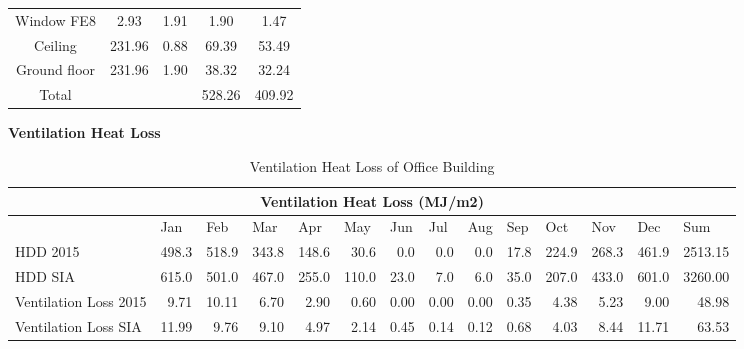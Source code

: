 \documentclass[11pt, a4paper]{article}
\theoremstyle{definition}
\begin{document}
\begin{table}[H]
\begin{tabular}{crrrr}
		    Window FE8 & \multicolumn{1}{c}{2.93} & \multicolumn{1}{c}{1.91} & \multicolumn{1}{c}{1.90} & \multicolumn{1}{c}{1.47} \\
		    Ceiling & \multicolumn{1}{c}{231.96} & \multicolumn{1}{c}{0.88} & \multicolumn{1}{c}{69.39} & \multicolumn{1}{c}{53.49} \\
		    Ground floor & \multicolumn{1}{c}{231.96} & \multicolumn{1}{c}{1.90} & \multicolumn{1}{c}{38.32} & \multicolumn{1}{c}{32.24} \\
		    \midrule
		    Total &       &       & 528.26 & 409.92 \\
		    \bottomrule
		    \end{tabular}%
		  \label{tab:SumatraTransmission Loss}%
		\end{table}%


		\textbf{Ventilation Heat Loss}\\
\begin{table}[H]
  \centering
  \small
  \caption{Ventilation Heat Loss of Office Building}
    \begin{tabular}{|p{4.5em}rrrrrrrrrrrrr|}
    \toprule
    \multicolumn{14}{|c|}{Ventilation Heat Loss (MJ/m2)} \\
    \midrule
    \multicolumn{1}{|l}{ } & \multicolumn{1}{l}{Jan} & \multicolumn{1}{l}{Feb} & \multicolumn{1}{l}{Mar} & \multicolumn{1}{l}{Apr} & \multicolumn{1}{l}{May} & \multicolumn{1}{l}{Jun} & \multicolumn{1}{l}{Jul} & \multicolumn{1}{l}{Aug} & \multicolumn{1}{l}{Sep} & \multicolumn{1}{l}{Oct} & \multicolumn{1}{l}{Nov} & \multicolumn{1}{l}{Dec} & \multicolumn{1}{l|}{Sum} \\
    \midrule
    \multicolumn{1}{|l}{HDD 2015} & 498.3 & 518.9 & 343.8 & 148.6 & 30.6 & 0.0  & 0.0  & 0.0  & 17.8 & 224.9 & 268.3 & 461.9 & 2513.15 \\
    \multicolumn{1}{|l}{HDD SIA} & 615.0 & 501.0 & 467.0 & 255.0 & 110.0 & 23.0 & 7.0  & 6.0  & 35.0 & 207.0 & 433.0 & 601.0 & 3260.00 \\
    Ventilation Loss 2015 & 9.71 & 10.11 & 6.70 & 2.90 & 0.60 & 0.00 & 0.00 & 0.00 & 0.35 & 4.38 & 5.23 & 9.00 & 48.98 \\
    Ventilation Loss SIA & 11.99 & 9.76 & 9.10 & 4.97 & 2.14 & 0.45 & 0.14 & 0.12 & 0.68 & 4.03 & 8.44 & 11.71 & 63.53 \\
    \bottomrule
    \end{tabular}%
  \label{tab:SumatraVentLoss}%
\end{table}%
\end{document}
